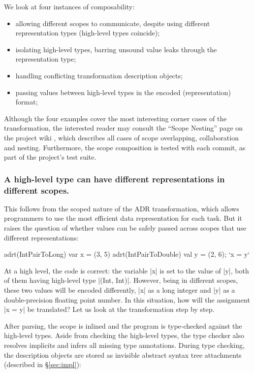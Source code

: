 We look at four instances of composability:

\begin{itemize}
  \item allowing different scopes to communicate, despite using different representation types (high-level types coincide);
  \item isolating high-level types, barring unsound value leaks through the representation type;
  \item handling conflicting transformation description objects;
  \item passing values between high-level types in the encoded (representation) format;
\end{itemize}

Although the four examples cover the most interesting corner cases of the transformation, the interested reader may consult the ``Scope Nesting'' page on the project wiki \cite{ildl-plugin-wiki}, which describes all cases of scope overlapping, collaboration and nesting. Furthermore, the scope composition is tested with each commit, as part of the project's test suite.

\subsubsection{A high-level type can have different representations in different scopes.} This follows from the scoped nature of the ADR transformation, which allows programmers to use the most efficient data representation for each task. But it raises the question of whether values can be safely passed across scopes that use different representations:

\begin{lstlisting-nobreak}
adrt(IntPairToLong)   { var x = (3, 5) }
adrt(IntPairToDouble) { val y = (2, 6); `x = y` }
\end{lstlisting-nobreak}

At a high level, the code is correct: the variable |x| is set to the value of |y|, both of them having high-level type |(Int, Int)|. However, being in different scopes, these two values will be encoded differently, |x| as a long integer and |y| as a double-precision floating point number. In this situation, how will the assignment |x = y| be translated? Let us look at the transformation step by step.

After parsing, the scope is inlined and the program is type-checked against the high-level types. Aside from checking the high-level types, the type checker also resolves implicits and infers all missing type annotations. During type checking, the description objects are stored as invisible abstract syntax tree attachments (described in \S\ref{sec:impl}):

